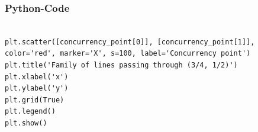 \documentclass{beamer}
\begin{document}
\begin{frame}[fragile]
\frametitle{Python-Code}
\begin{lstlisting}

plt.scatter([concurrency_point[0]], [concurrency_point[1]], color='red', marker='X', s=100, label='Concurrency point')
plt.title('Family of lines passing through (3/4, 1/2)')
plt.xlabel('x')
plt.ylabel('y')
plt.grid(True)
plt.legend()
plt.show()
\end{lstlisting}
\end{frame}
\end{document}
